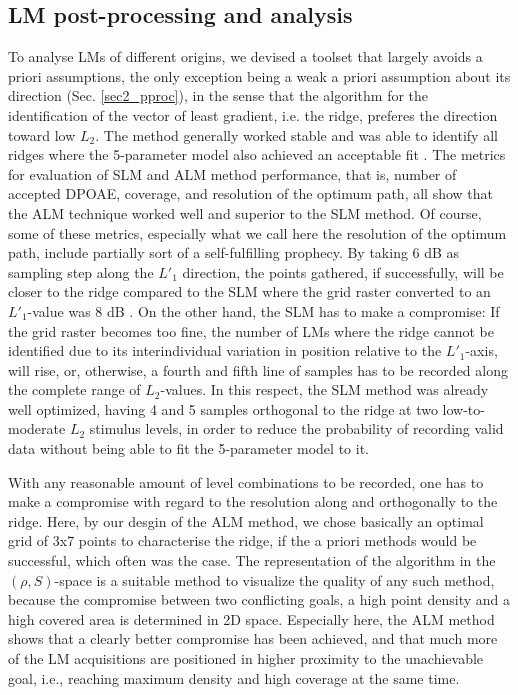 \documentclass[journal,twoside,web]{ieeecolor2}
\begin{document}
\subsection{LM post-processing and analysis}
To analyse LMs of different origins, we devised a toolset that largely avoids a priori assumptions, the only exception being a weak a priori assumption about its direction (Sec. \ref{sec2_pproc}), in the sense that the algorithm for the identification of the vector of least gradient, i.e. the ridge, preferes the direction toward low $L_2$.
The method generally worked stable and was able to identify all ridges where the 5-parameter model also achieved an acceptable fit .
The metrics for evaluation of SLM and ALM method performance, that is, number of accepted DPOAE, coverage, and resolution of the optimum path, all show that the ALM technique worked well and superior to the SLM method.
Of course, some of these metrics, especially what we call here the resolution of the optimum path, include partially sort of a self-fulfilling prophecy.
By taking 6 dB as sampling step along the $L'_1$ direction, the points gathered, if successfully, will be closer to the ridge compared to the SLM where the grid raster converted to an $L'_1$-value was 8 dB .
On the other hand, the SLM has to make a compromise: If the grid raster becomes too fine, the number of LMs where the ridge cannot be identified due to its interindividual variation in position relative to the $L'_1$-axis, will rise, or, otherwise, a fourth and fifth line of samples has to be recorded along the complete range of $L_2$-values.
In this respect, the SLM method was already well optimized, having 4 and 5 samples orthogonal to the ridge at two low-to-moderate $L_2$ stimulus levels, in order to reduce the probability of recording valid data without being able to fit the 5-parameter model to it.

With any reasonable amount of  level combinations to be recorded, one has to make a compromise with regard to the resolution along and orthogonally to the ridge.
Here, by our desgin of the ALM method, we chose basically an optimal grid of 3x7 points to characterise the ridge, if the a priori methods would be successful, which often was the case.
The representation of the algorithm in the $(\rho, S)$-space is a suitable method to visualize the quality of any such method, because the compromise between two conflicting goals, a high point density and a high covered area is determined in 2D space.
Especially here, the ALM method shows that a clearly better compromise has been achieved, and that much more of the LM acquisitions are positioned in higher proximity to the unachievable goal, i.e., reaching maximum density and high coverage at the same time.
\end{document}
